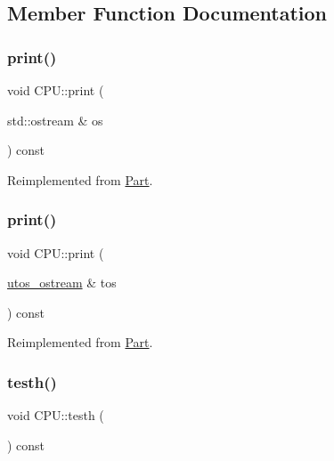 \subsection{Member Function Documentation}
\mbox{\label{class_c_p_u_ad4d3ebb288deeaad640e034bdb71a40a}} 
\subsubsection{\texorpdfstring{print()}{print()}\hspace{0.1cm}{\footnotesize\ttfamily [1/2]}}
{\footnotesize\ttfamily void C\+P\+U\+::print (\begin{DoxyParamCaption}\item[{std\+::ostream \&}]{os }\end{DoxyParamCaption}) const\hspace{0.3cm}{\ttfamily [virtual]}}



Reimplemented from \mbox{\hyperlink{class_part_a4fa402b8e8fd4236ff773a7697ab2bc3}{Part}}.

\mbox{\label{class_c_p_u_a0aea700bac0896b9e4434770737078d0}} 
\subsubsection{\texorpdfstring{print()}{print()}\hspace{0.1cm}{\footnotesize\ttfamily [2/2]}}
{\footnotesize\ttfamily void C\+P\+U\+::print (\begin{DoxyParamCaption}\item[{\mbox{\hyperlink{structutos__ostream}{utos\+\_\+ostream}} \&}]{tos }\end{DoxyParamCaption}) const\hspace{0.3cm}{\ttfamily [virtual]}}



Reimplemented from \mbox{\hyperlink{class_part_a9ecabe44ba3415badf82c6a23617a41e}{Part}}.

\mbox{\label{class_c_p_u_a9e6b8807b179e06080d52f08e988bd57}} 
\subsubsection{\texorpdfstring{testh()}{testh()}}
{\footnotesize\ttfamily void C\+P\+U\+::testh (\begin{DoxyParamCaption}{ }\end{DoxyParamCaption}) const}



